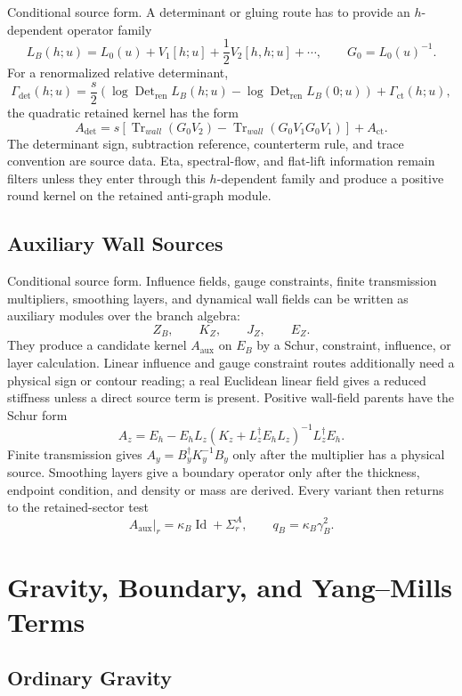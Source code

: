 \documentclass[11pt]{article}
\newcommand{\Id}{\operatorname{Id}}
\begin{document}
Conditional source form.  A determinant or gluing route has to provide an
\(h\)-dependent operator family
\[
  L_B(h;u)=L_0(u)+V_1[h;u]+\frac12 V_2[h,h;u]+\cdots ,
  \qquad G_0=L_0(u)^{-1}.
\]
For a renormalized relative determinant,
\[
  \Gamma_{\mathrm{det}}(h;u)
    =\frac{s}{2}\left(
       \log\operatorname{Det}_{\mathrm{ren}}L_B(h;u)
       -\log\operatorname{Det}_{\mathrm{ren}}L_B(0;u)
     \right)+\Gamma_{\mathrm{ct}}(h;u),
\]
the quadratic retained kernel has the form
\[
  A_{\mathrm{det}}
   =s\left[
      \operatorname{Tr}_{wall}(G_0V_2)
      -\operatorname{Tr}_{wall}(G_0V_1G_0V_1)
    \right]+A_{\mathrm{ct}} .
\]
The determinant sign, subtraction reference, counterterm rule, and trace
convention are source data.  Eta, spectral-flow, and flat-lift information
remain filters unless they enter through this \(h\)-dependent family and
produce a positive round kernel on the retained anti-graph module.

\subsection{Auxiliary Wall Sources}

Conditional source form.  Influence fields, gauge constraints, finite
transmission multipliers, smoothing layers, and dynamical wall fields can be
written as auxiliary modules over the branch algebra:
\[
  Z_B,\qquad K_Z,\qquad J_Z,\qquad E_Z .
\]
They produce a candidate kernel \(A_{\mathrm{aux}}\) on \(E_B\) by a Schur,
constraint, influence, or layer calculation.  Linear influence and gauge
constraint routes additionally need a physical sign or contour reading; a
real Euclidean linear field gives a reduced stiffness unless a direct source
term is present.  Positive wall-field parents have the Schur form
\[
  A_z=E_h-E_hL_z(K_z+L_z^\dagger E_hL_z)^{-1}L_z^\dagger E_h .
\]
Finite transmission gives \(A_y=B_y^\dagger K_y^{-1}B_y\) only after the
multiplier has a physical source.  Smoothing layers give a boundary operator
only after the thickness, endpoint condition, and density or mass are derived.
Every variant then returns to the retained-sector test
\[
  A_{\mathrm{aux}}\vert_r=\kappa_B\Id+\Sigma_r^A,\qquad
  q_B=\kappa_B\gamma_B^2 .
\]

\section{Gravity, Boundary, and Yang--Mills Terms}

\subsection{Ordinary Gravity}
\end{document}
